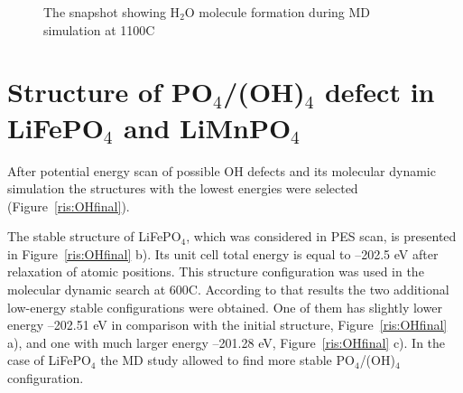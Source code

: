 \begin{figure}[h!]
\caption{The snapshot showing H$_2$O molecule formation during MD simulation at 1100\textdegree C}
\label{ris:H2O}
\end{figure}

\section{Structure of PO$_4$/(OH)$_4$ defect in LiFePO$_4$ and LiMnPO$_4$}

After potential energy scan of possible OH defects and its molecular dynamic simulation the structures with the lowest energies were selected (Figure~\ref{ris:OHfinal}).

The stable structure of LiFePO$_4$, which was considered in PES scan, is presented in  Figure~\ref{ris:OHfinal} b). Its unit cell total energy is equal to --202.5 eV after relaxation of atomic positions. This structure configuration was used in the molecular dynamic search at 600\textdegree C. According to that results the two additional low-energy stable configurations were obtained. One of them has slightly lower energy --202.51 eV in comparison with the initial structure, Figure~\ref{ris:OHfinal} a), and one with much larger energy --201.28 eV, Figure~\ref{ris:OHfinal} c). In the case of LiFePO$_4$ the MD study allowed to find more stable PO$_4$/(OH)$_4$ configuration.

